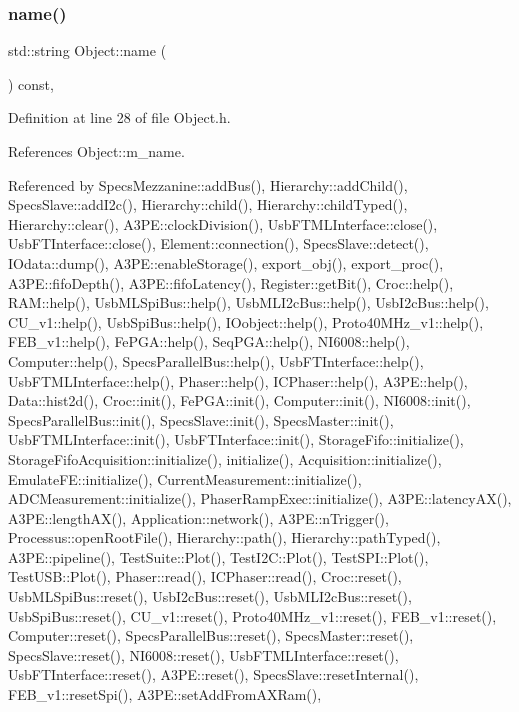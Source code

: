 \subsubsection{\texorpdfstring{name()}{name()}}
{\footnotesize\ttfamily std\+::string Object\+::name (\begin{DoxyParamCaption}{ }\end{DoxyParamCaption}) const\hspace{0.3cm}{\ttfamily [inline]}, {\ttfamily [inherited]}}



Definition at line 28 of file Object.\+h.



References Object\+::m\+\_\+name.



Referenced by Specs\+Mezzanine\+::add\+Bus(), Hierarchy\+::add\+Child(), Specs\+Slave\+::add\+I2c(), Hierarchy\+::child(), Hierarchy\+::child\+Typed(), Hierarchy\+::clear(), A3\+P\+E\+::clock\+Division(), Usb\+F\+T\+M\+L\+Interface\+::close(), Usb\+F\+T\+Interface\+::close(), Element\+::connection(), Specs\+Slave\+::detect(), I\+Odata\+::dump(), A3\+P\+E\+::enable\+Storage(), export\+\_\+obj(), export\+\_\+proc(), A3\+P\+E\+::fifo\+Depth(), A3\+P\+E\+::fifo\+Latency(), Register\+::get\+Bit(), Croc\+::help(), R\+A\+M\+::help(), Usb\+M\+L\+Spi\+Bus\+::help(), Usb\+M\+L\+I2c\+Bus\+::help(), Usb\+I2c\+Bus\+::help(), C\+U\+\_\+v1\+::help(), Usb\+Spi\+Bus\+::help(), I\+Oobject\+::help(), Proto40\+M\+Hz\+\_\+v1\+::help(), F\+E\+B\+\_\+v1\+::help(), Fe\+P\+G\+A\+::help(), Seq\+P\+G\+A\+::help(), N\+I6008\+::help(), Computer\+::help(), Specs\+Parallel\+Bus\+::help(), Usb\+F\+T\+Interface\+::help(), Usb\+F\+T\+M\+L\+Interface\+::help(), Phaser\+::help(), I\+C\+Phaser\+::help(), A3\+P\+E\+::help(), Data\+::hist2d(), Croc\+::init(), Fe\+P\+G\+A\+::init(), Computer\+::init(), N\+I6008\+::init(), Specs\+Parallel\+Bus\+::init(), Specs\+Slave\+::init(), Specs\+Master\+::init(), Usb\+F\+T\+M\+L\+Interface\+::init(), Usb\+F\+T\+Interface\+::init(), Storage\+Fifo\+::initialize(), Storage\+Fifo\+Acquisition\+::initialize(), initialize(), Acquisition\+::initialize(), Emulate\+F\+E\+::initialize(), Current\+Measurement\+::initialize(), A\+D\+C\+Measurement\+::initialize(), Phaser\+Ramp\+Exec\+::initialize(), A3\+P\+E\+::latency\+A\+X(), A3\+P\+E\+::length\+A\+X(), Application\+::network(), A3\+P\+E\+::n\+Trigger(), Processus\+::open\+Root\+File(), Hierarchy\+::path(), Hierarchy\+::path\+Typed(), A3\+P\+E\+::pipeline(), Test\+Suite\+::\+Plot(), Test\+I2\+C\+::\+Plot(), Test\+S\+P\+I\+::\+Plot(), Test\+U\+S\+B\+::\+Plot(), Phaser\+::read(), I\+C\+Phaser\+::read(), Croc\+::reset(), Usb\+M\+L\+Spi\+Bus\+::reset(), Usb\+I2c\+Bus\+::reset(), Usb\+M\+L\+I2c\+Bus\+::reset(), Usb\+Spi\+Bus\+::reset(), C\+U\+\_\+v1\+::reset(), Proto40\+M\+Hz\+\_\+v1\+::reset(), F\+E\+B\+\_\+v1\+::reset(), Computer\+::reset(), Specs\+Parallel\+Bus\+::reset(), Specs\+Master\+::reset(), Specs\+Slave\+::reset(), N\+I6008\+::reset(), Usb\+F\+T\+M\+L\+Interface\+::reset(), Usb\+F\+T\+Interface\+::reset(), A3\+P\+E\+::reset(), Specs\+Slave\+::reset\+Internal(), F\+E\+B\+\_\+v1\+::reset\+Spi(), A3\+P\+E\+::set\+Add\+From\+A\+X\+Ram(), 